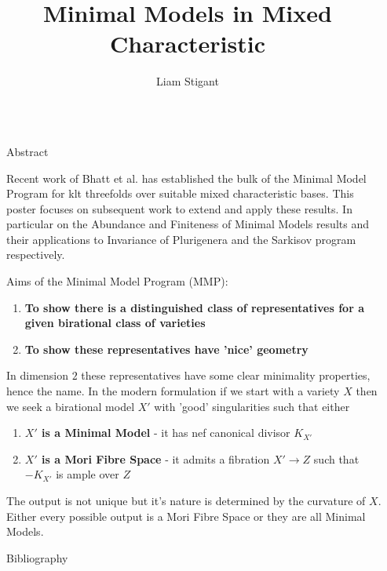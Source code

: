 \documentclass[final]{beamer}
\title{Minimal Models in Mixed Characteristic}
\author{Liam Stigant}
\institute[shortinst]{Imperial College London}
\newlength{\sepwidth}
\newlength{\colwidth}
\newcommand{\separatorcolumn}{\begin{column}{\sepwidth}\end{column}}
\begin{document}
	
	\begin{frame}[t, fragile]
	\begin{columns}[t]
		\separatorcolumn
		
		\begin{column}{\colwidth}
			
			\begin{block}{Abstract}
				
				Recent work of Bhatt et al. has established the bulk of the Minimal Model Program for klt threefolds over suitable mixed characteristic bases. This poster focuses on subsequent work to extend and apply these results. In particular on the Abundance and Finiteness of Minimal Models results and their applications to Invariance of Plurigenera and the Sarkisov program respectively.
				
			\end{block}
			
			\begin{block}{Aims of the Minimal Model Program (MMP):}
				\begin{enumerate}
					\item \textbf{To show there is a distinguished class of representatives for a given birational class of varieties}
					\item \textbf{To show these representatives have 'nice' geometry}
				\end{enumerate}
				
				In dimension $2$ these representatives have some clear minimality properties, hence the name. In the modern formulation if we start with a variety $X$ then we seek a birational model $X'$ with 'good' singularities such that either  
				\begin{enumerate}
					\item \textbf{$X'$ is a Minimal Model} - it has nef canonical divisor $K_{X'}$
					\item \textbf{$X'$ is a Mori Fibre Space} - it admits a fibration $X' \to  Z$ such that $-K_{X'}$ is ample over $Z$ 
				\end{enumerate}
				
				The output is not unique but it's nature is determined by the curvature of $X$. Either every possible output is a Mori Fibre Space or they are all Minimal Models.
			\end{block}
			
			
			\begin{block}{Bibliography}
				
				
			\end{block}
			

\end{column}
\end{columns}
\end{frame}
\end{document}
